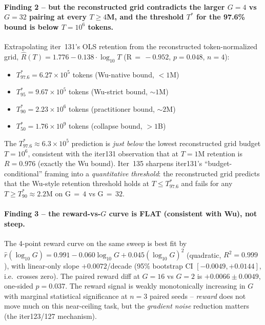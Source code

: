 \paragraph{Finding 2 -- but the reconstructed grid contradicts the larger $G\!=\!4$ vs
$G\!=\!32$ pairing at every $T\!\ge\!4$M, and the threshold $T^{\ast}$
for the 97.6\% bound is below $T\!=\!10^{6}$ tokens.}
Extrapolating iter~131's OLS retention from the reconstructed token-normalized
grid, $\hat{R}(T) = 1.776 - 0.138 \cdot
\log_{10}T$ (R$\,{=}\,{-}0.952$, $p\!=\!0.048$, $n\!=\!4$):
\begin{itemize}\itemsep2pt
\item $T^{\ast}_{97.6} = 6.27\!\times\!10^{5}$ tokens (Wu-native bound, $<\!1$M)
\item $T^{\ast}_{95} = 9.67\!\times\!10^{5}$ tokens (Wu-strict bound, $\sim\!1$M)
\item $T^{\ast}_{90} = 2.23\!\times\!10^{6}$ tokens (practitioner bound, $\sim\!2$M)
\item $T^{\ast}_{50} = 1.76\!\times\!10^{9}$ tokens (collapse bound, $>\!1$B)
\end{itemize}
The $T^{\ast}_{97.6} \!\approx\! 6.3\!\times\!10^{5}$ prediction is
\emph{just below} the lowest reconstructed grid budget $T\!=\!10^{6}$, consistent
with the iter131 observation that at $T\!=\!1$M retention is
$R\!=\!0.976$ (exactly the Wu bound). Iter~135 sharpens iter131's
``budget-conditional'' framing into a \emph{quantitative threshold}:
the reconstructed grid predicts that the Wu-style retention threshold holds at
$T\!\le\!T^{\ast}_{97.6}$ and fails for any
$T\!\ge\!T^{\ast}_{90}\!\approx\!2.2$M on G$\,{=}\,4$ vs G$\,{=}\,32$.

\paragraph{Finding 3 -- the reward-vs-$G$ curve is FLAT (consistent with
Wu), not steep.}
The 4-point reward curve on the same sweep is best fit by
$\hat{r}(\log_{10}G) = 0.991 - 0.060 \log_{10}G + 0.045 (\log_{10}G)^{2}$
(quadratic, $R^{2}\!=\!0.999$), with linear-only slope
$+0.0072$/decade (95\% bootstrap CI $[-0.0049, +0.0144]$, i.e.\ crosses
zero). The paired reward diff at $G\!=\!16$ vs $G\!=\!2$ is
$+0.0066 \pm 0.0049$, one-sided $p\!=\!0.037$. The reward signal is
weakly monotonically increasing in $G$ with marginal statistical
significance at $n\!=\!3$ paired seeds -- \emph{reward} does not move
much on this near-ceiling task, but the \emph{gradient noise}
reduction matters (the iter123/127 mechanism).

